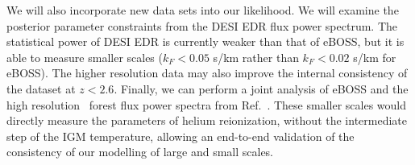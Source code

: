We will also incorporate new data sets into our likelihood.
We will examine the posterior parameter constraints from the DESI EDR flux power spectrum.
The statistical power of DESI EDR is currently weaker than that of eBOSS, but it is able to measure smaller scales ($k_F < 0.05$ s/km rather than $k_F < 0.02$ s/km for eBOSS).
The higher resolution data may also improve the internal consistency of the dataset at $z < 2.6$.
Finally, we can perform a joint analysis of eBOSS and the high resolution \Lya~forest flux power spectra from Ref.~\cite{2022MNRAS.509.2842K}.
These smaller scales would directly measure the parameters of helium reionization, without the intermediate step of the IGM temperature, allowing an end-to-end validation of the consistency of our modelling of large and small scales.
